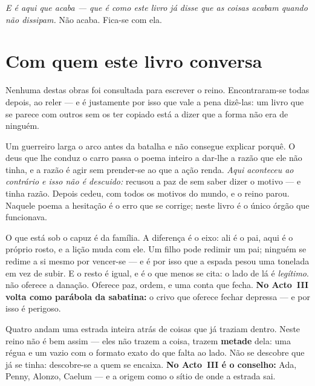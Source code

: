 \documentclass[livro.tex]{subfiles}
\begin{document}
\medskip

\emph{E é aqui que acaba --- que é como este livro já disse que as coisas acabam quando não
dissipam.} Não acaba. Fica-se com ela.

\chapter*{Com quem este livro conversa}

Nenhuma destas obras foi consultada para escrever o reino. Encontraram-se todas depois, ao
reler --- e é justamente por isso que vale a pena dizê-las: um livro que se parece com outros sem
os ter copiado está a dizer que a forma não era de ninguém.

\begin{description}\itemsep8pt

\item[O Bhagavad Gita.] Um guerreiro larga o arco antes da batalha e não consegue explicar porquê.
O deus que lhe conduz o carro passa o poema inteiro a dar-lhe a razão que ele não tinha, e a razão
é agir sem prender-se ao que a ação renda. \emph{Aqui aconteceu ao contrário e isso não é
descuido:} \Ben recusou a paz de \Drk sem saber dizer o motivo --- e tinha razão. Depois cedeu,
com todos os motivos do mundo, e o reino parou. Naquele poema a hesitação é o erro que se corrige;
neste livro é o único órgão que funcionava.

\item[\emph{Guerra das Estrelas}.] O que está sob o capuz é da família. A diferença é o eixo: ali é
o pai, aqui é o próprio rosto, e a lição muda com ele. Um filho pode redimir um pai; ninguém se
redime a si mesmo por vencer-se --- e é por isso que a espada pesou uma tonelada em vez de subir.
E o resto é igual, e é o que menos se cita: o lado de lá é \emph{legítimo}. \Drk não oferece a
danação. Oferece paz, ordem, e uma conta que fecha. \textbf{No Acto~III volta como parábola da
sabatina:} o crivo que oferece fechar depressa --- e por isso é perigoso.

\item[\emph{O Feiticeiro de Oz}.] Quatro andam uma estrada inteira atrás de coisas que já traziam
dentro. Neste reino não é bem assim --- eles não trazem a coisa, trazem \textbf{metade} dela: uma
régua e um vazio com o formato exato do que falta ao lado. Não se descobre que já se tinha: descobre-se
a quem se encaixa. \textbf{No Acto~III é o conselho:} Ada, Penny, Alonzo, Caelum --- e a origem
como o sítio de onde a estrada sai.


\end{description}
\end{document}
